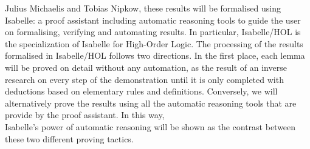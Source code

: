 \begin{isabellebody}
\begin{isamarkuptext}
Julius Michaelis and Tobias Nipkow, these results will be formalised 
using Isabelle: a proof assistant including automatic reasoning tools 
to guide the user on formalising, verifying and automating results. In 
particular, Isabelle/HOL is the specialization of Isabelle for 
High-Order Logic. The processing of the results formalised in 
Isabelle/HOL follows two directions. In the first place, each lemma 
will be proved on detail without any automation, as the result of an 
inverse research on every step of the demonstration until it is only 
completed with deductions based on elementary rules and definitions. 
Conversely, we will alternatively prove the results using all the 
automatic reasoning tools that are provide by the proof assistant. In 
this way,\\ Isabelle’s power of automatic reasoning will be shown as the 
contrast between these two different proving tactics.%
\end{isamarkuptext}\isamarkuptrue%
%
\isadelimtheory
%
\endisadelimtheory
%
\isatagtheory
%
\endisatagtheory
{\isafoldtheory}%
%
\isadelimtheory
%
\endisadelimtheory
%
\end{isabellebody}%
\endinput

